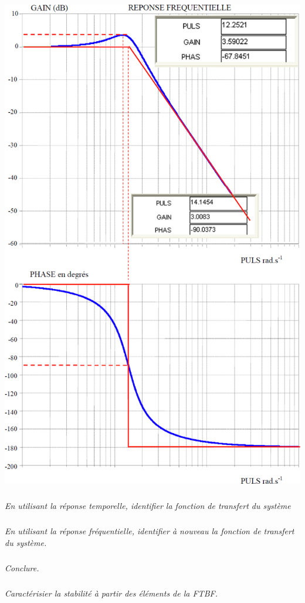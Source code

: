 \documentclass[10pt,fleqn]{article} %
\begin{document}
\begin{multicols}{2}
\begin{center}
\includegraphics[width=\linewidth]{images/fig_03}
\end{center}



\subparagraph{}\textit{En utilisant la réponse temporelle, identifier la fonction de transfert du système}

\subparagraph{}\textit{En utilisant la réponse fréquentielle, identifier à nouveau la fonction de transfert du système.}


\subparagraph{}\textit{Conclure.}

\subparagraph{}\textit{Caractérisier la stabilité à partir des éléments de la FTBF.}


\end{multicols}
\end{document}
